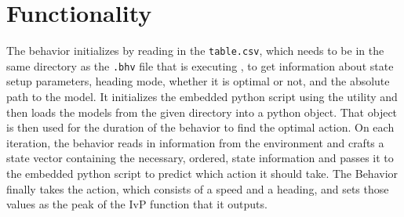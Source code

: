 \documentclass[onecolumn,letterpaper,11pt]{article}
\begin{document}
	\section{Functionality} 
	
	The behavior initializes by reading in the \texttt{table.csv}, which needs to be in the same directory as the \texttt{.bhv} file that is executing , to get information about state setup parameters, heading mode, whether it is optimal or not, and the absolute path to the model. It initializes the embedded python script using the  utility and then loads the models from the given directory into a python object. That object is then used for the duration of the behavior to find the optimal action. On each iteration, the behavior reads in information from the environment and crafts a state vector containing the necessary, ordered, state information and passes it to the embedded python script to predict which action it should take. The Behavior finally takes the action, which consists of a speed and a heading, and sets those values as the peak of the IvP function that it outputs. 
	
\end{document}
